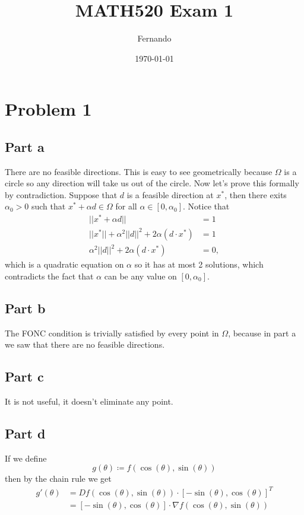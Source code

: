 \documentclass{article}
\begin{document}
\title{MATH520 Exam 1}
\author{Fernando}
\date{\today}
\maketitle

\section*{Problem 1}
\subsection*{Part a}
There are no feasible directions. This is easy to see geometrically because
$\Omega$ is a circle so any direction will take us out of the circle. Now let's
prove this formally by contradiction. Suppose that $d$ is a feasible direction
at $x^*$, then there exits $\alpha_0>0$ such that $x^*+\alpha d\in\Omega$ for
all $\alpha \in [0,\alpha_0]$. Notice that
\begin{align*}
||x^*+\alpha d||&=1\\
||x^*||+\alpha^2||d||^2+2\alpha (d\cdot x^*)&=1\\
\alpha^2||d||^2+2\alpha (d\cdot x^*)&=0,
\end{align*}
which is a quadratic equation on $\alpha$ so it has at most 2 solutions, which
contradicts the fact that $\alpha$ can be any value on $[0,\alpha_0]$.
\subsection*{Part b}
The FONC condition is trivially satisfied by every point in $\Omega$, because
in part a we saw that there are no feasible directions.
\subsection*{Part c}
It is not useful, it doesn't eliminate any point.
\subsection*{Part d}
If we define
\[
g(\theta)\coloneq f(\cos(\theta),\sin(\theta))
\]
then by the chain rule we get
\begin{align*}
g'(\theta)
&=Df(\cos(\theta),\sin(\theta))\cdot
[-\sin(\theta),\cos(\theta)]^T\\
&=[-\sin(\theta),\cos(\theta)]\cdot
\nabla f(\cos(\theta),\sin(\theta))
\end{align*}
\end{document}
